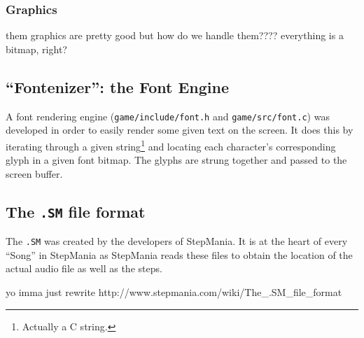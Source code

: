 	\subsubsection{Graphics}
		them graphics are pretty good but how do we handle them????
		everything is a bitmap, right?
\subsection{``Fontenizer'': the Font Engine}
	A font rendering engine (\texttt{game/include/font.h} and \texttt{game/src/font.c}) was developed in order to easily render some given text on the screen.
	It does this by iterating through a given string\footnote{Actually a C string.} and locating each character's corresponding glyph in a given font bitmap.
	The glyphs are strung together and passed to the screen buffer.

\subsection{The \texttt{.SM} file format}
	The \texttt{.SM} was created by the developers of StepMania. It is at the heart of every ``Song'' in StepMania as StepMania reads these files to obtain the location of the actual audio file as well as the steps.
	
	yo imma just rewrite http://www.stepmania.com/wiki/The_.SM_file_format
